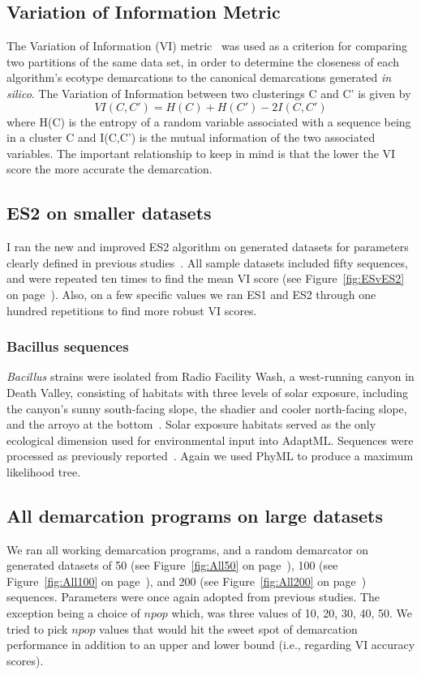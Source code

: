 \subsection*{Variation of Information Metric}
The Variation of Information (VI) metric~\cite{meilua2003comparing} was used as a criterion for comparing two partitions of the same data set, in order to determine the closeness of each algorithm's ecotype demarcations to the canonical demarcations generated \emph{in silico}.
The Variation of Information between two clusterings C and C' is given by$$VI(C, C') = H(C) + H(C') - 2I(C, C')$$where H(C) is the entropy of a random variable associated with a sequence being in a cluster C and I(C,C') is the mutual information of the two associated variables. 
The important relationship to keep in mind is that the lower the VI score the more accurate the demarcation.

\subsection*{ES2 on smaller datasets}
I ran the new and improved ES2 algorithm on generated datasets for parameters clearly defined in previous studies~\cite{carlo}.
All sample datasets included fifty sequences, and were repeated ten times to find the mean VI score (see Figure~\ref{fig:ESvES2} on page~\pageref{fig:ESvES2}). Also, on a few specific values we ran ES1 and ES2 through one hundred repetitions to find more robust VI scores.

\subsubsection*{Bacillus sequences}
\emph{Bacillus} strains were isolated from Radio Facility Wash, a west-running canyon in Death Valley, consisting of habitats with three levels of solar exposure, including the canyon's sunny south-facing slope, the shadier and cooler north-facing slope, and the arroyo at the bottom~\cite{connor2010ecology}.
Solar exposure habitats served as the only ecological dimension used for environmental input into AdaptML.
Sequences were processed as previously reported~\cite{carlo}.
Again we used PhyML to produce a maximum likelihood tree.

\subsection*{All demarcation programs on large datasets}
We ran all working demarcation programs, and a random demarcator on generated datasets of 50 (see Figure~\ref{fig:All50} on page~\pageref{fig:All50}), 100 (see Figure~\ref{fig:All100} on page~\pageref{fig:All100}), and 200 (see Figure~\ref{fig:All200} on page~\pageref{fig:All200}) sequences.
Parameters were once again adopted from previous studies.
The exception being a choice of $npop$ which, was three values of 10, 20, 30, 40, 50.
We tried to pick $npop$ values that would hit the sweet spot of demarcation performance in addition to an upper and lower bound (i.e., regarding VI accuracy scores).

